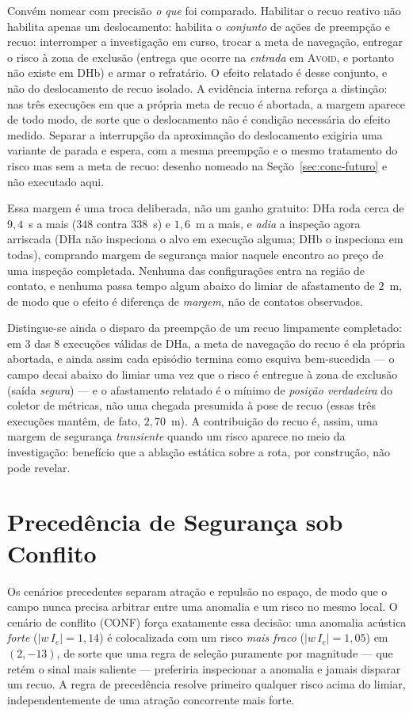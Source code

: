 Convém nomear com precisão \emph{o que} foi comparado. Habilitar o recuo reativo não
habilita apenas um deslocamento: habilita o \emph{conjunto} de ações de preempção e
recuo: interromper a investigação em curso, trocar a meta de navegação, entregar o
risco à zona de exclusão (entrega que ocorre na \emph{entrada} em \textsc{Avoid}, e
portanto não existe em DHb) e armar o refratário. O efeito relatado é desse conjunto, e
não do deslocamento de recuo isolado. A evidência interna reforça a distinção: nas três
execuções em que a própria meta de recuo é abortada, a margem aparece de todo modo, de
sorte que o deslocamento não é condição necessária do efeito medido. Separar a
interrupção da aproximação do deslocamento exigiria uma variante de parada e espera, com
a mesma preempção e o mesmo tratamento do risco mas sem a meta de recuo: desenho
nomeado na Seção~\ref{sec:conc-futuro} e não executado aqui.

Essa margem é uma troca deliberada, não um ganho gratuito: DHa roda cerca de
$9{,}4$~s a mais ($348$ contra $338$~s) e $1{,}6$~m a mais, e \emph{adia} a inspeção
agora arriscada (DHa não inspeciona o alvo em execução alguma; DHb o inspeciona em
todas), comprando margem de segurança maior naquele encontro ao preço de uma inspeção
completada. Nenhuma das configurações entra na região de contato, e nenhuma passa
tempo algum abaixo do limiar de afastamento de $2$~m, de modo que o efeito é
diferença de \emph{margem}, não de contatos observados.

Distingue-se ainda o disparo da preempção de um recuo limpamente completado: em $3$
das $8$ execuções válidas de DHa, a meta de navegação do recuo é ela própria
abortada, e ainda assim cada episódio termina como esquiva bem-sucedida --- o campo
decai abaixo do limiar uma vez que o risco é entregue à zona de exclusão (saída
\emph{segura}) --- e o afastamento relatado é o mínimo de \emph{posição verdadeira}
do coletor de métricas, não uma chegada presumida à pose de recuo (essas três
execuções mantêm, de fato, $2{,}70$~m). A contribuição do recuo é, assim, uma margem
de segurança \emph{transiente} quando um risco aparece no meio da investigação: benefício que a ablação estática sobre a rota, por construção, não pode revelar.

\section{Precedência de Segurança sob Conflito}
\label{sec:res-conflito}

Os cenários precedentes separam atração e repulsão no espaço, de modo que o campo
nunca precisa arbitrar entre uma anomalia e um risco no mesmo local. O cenário de
conflito (CONF) força exatamente essa decisão: uma anomalia acústica \emph{forte}
($|w\,I_e|=1{,}14$) é colocalizada com um risco \emph{mais fraco}
($|w\,I_e|=1{,}05$) em $(2,-13)$, de sorte que uma regra de seleção puramente por
magnitude --- que retém o sinal mais saliente --- preferiria inspecionar a anomalia e
jamais disparar um recuo. A regra de precedência resolve primeiro qualquer risco
acima do limiar, independentemente de uma atração concorrente mais forte.

